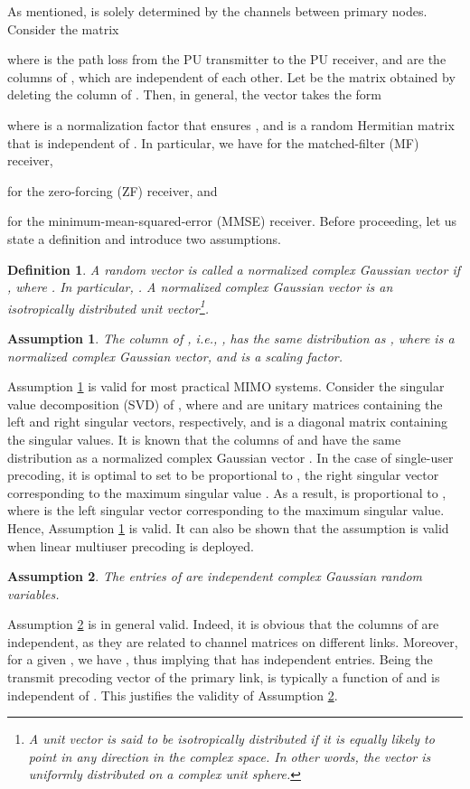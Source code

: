 \documentclass[twocolumn,10pt]{IEEEtran}
\theoremstyle{plain} \newtheorem{theorem}{Theorem}
\theoremstyle{plain} \newtheorem{proposition}{Proposition}
\theoremstyle{plain} \newtheorem{corollary}{Corollary}
\theoremstyle{remark} \newtheorem{remark}{Remark}
\theoremstyle{remark} \newtheorem{lemma}{Lemma}
\theoremstyle{plain} \newtheorem{definition}{Definition}
\theoremstyle{plain} \newtheorem{assumption}{Assumption}
\theoremstyle{plain} \newtheorem{fact}{Fact}
\begin{document}
As mentioned,  is solely determined by the channels between primary nodes. Consider the matrix

where  is the path loss from the  PU transmitter to the  PU receiver, and  are the columns of , which are independent of each other.  Let  be the  matrix obtained by deleting the  column of . Then, in general, the vector  takes the form

where  is a normalization factor that ensures , and  is a random Hermitian matrix that is independent of . In particular, we have  for the matched-filter (MF) receiver,

for the zero-forcing (ZF) receiver, and

for the minimum-mean-squared-error (MMSE) receiver. Before proceeding, let us state a definition and introduce two assumptions.
\begin{definition}
A random vector  is called a normalized complex Gaussian vector if , where . In particular, . A normalized complex Gaussian vector is an isotropically distributed unit vector\footnote{A unit vector is said to be isotropically distributed if it is equally likely to point in any direction in the complex space. In other words, the vector is uniformly distributed on a complex unit sphere.}.
\end{definition}

\begin{assumption}\label{ass:1}
The  column of , i.e., , has the same distribution as , where  is a normalized complex Gaussian vector, and  is a scaling factor.
\end{assumption}
Assumption \ref{ass:1} is valid for most practical MIMO systems. Consider the singular value decomposition (SVD) of , where   and  are unitary matrices containing the left and right singular vectors, respectively, and  is a diagonal matrix containing the singular values. It is known that the columns of  and  have the same distribution as a normalized complex Gaussian vector \cite{MH99}. In the case of single-user precoding, it is optimal to set  to be proportional to , the right singular vector corresponding to the maximum singular value  \cite{RC98}. As a result,  is proportional to , where  is the left singular vector corresponding to the maximum singular value. Hence, Assumption \ref{ass:1} is valid. It can also be shown that the assumption is valid when linear multiuser precoding is deployed.

\begin{assumption}\label{ass:2}
The entries of  are independent complex Gaussian random variables.
\end{assumption}
Assumption \ref{ass:2} is in general valid.  Indeed, it is obvious that the columns of  are independent, as they are related to channel matrices on different links. Moreover, for a given , we have , thus implying that  has independent entries. Being the transmit precoding vector of the  primary link,   is typically a function of  and is independent of . This justifies the validity of Assumption \ref{ass:2}.
\end{document}

